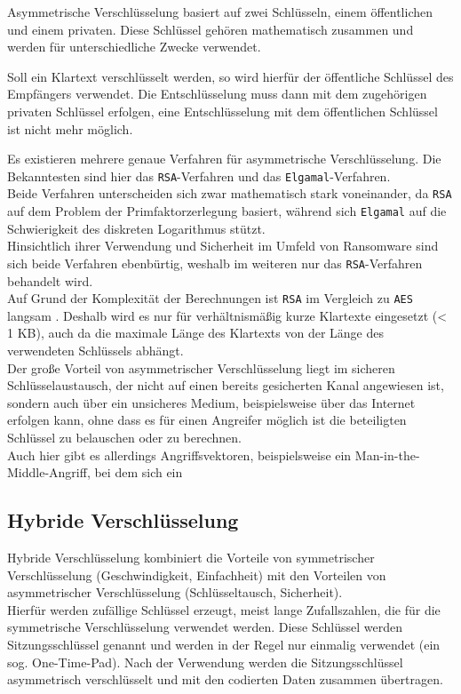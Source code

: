 Asymmetrische Verschlüsselung basiert auf zwei Schlüsseln, einem öffentlichen und einem privaten. Diese Schlüssel gehören mathematisch zusammen und werden für unterschiedliche Zwecke verwendet.

Soll ein Klartext verschlüsselt werden, so wird hierfür der öffentliche Schlüssel des Empfängers verwendet. Die Entschlüsselung muss dann mit dem zugehörigen privaten Schlüssel erfolgen, eine Entschlüsselung mit dem öffentlichen Schlüssel ist nicht mehr möglich.

Es existieren mehrere genaue Verfahren für asymmetrische Verschlüsselung. Die Bekanntesten sind hier das \texttt{RSA}-Verfahren und das \texttt{Elgamal}-Verfahren.\\
Beide Verfahren unterscheiden sich zwar mathematisch stark voneinander, da \texttt{RSA} auf dem Problem der Primfaktorzerlegung basiert, während sich \texttt{Elgamal} auf die Schwierigkeit des diskreten Logarithmus stützt. \\
Hinsichtlich ihrer Verwendung und Sicherheit im Umfeld von Ransomware sind sich beide Verfahren ebenbürtig, weshalb im weiteren nur das \texttt{RSA}-Verfahren behandelt wird.
\\

Auf Grund der Komplexität der Berechnungen ist \texttt{RSA} im Vergleich zu \texttt{AES} langsam \cite{crypto:aes_rsa_benchmark}. Deshalb wird es nur für verhältnismäßig kurze Klartexte eingesetzt (< 1 KB), auch da die maximale Länge des Klartexts von der Länge des verwendeten Schlüssels abhängt. %
\\

Der große Vorteil von asymmetrischer Verschlüsselung liegt im sicheren Schlüsselaustausch, der nicht auf einen bereits gesicherten Kanal angewiesen ist, sondern auch über ein unsicheres Medium, beispielsweise über das Internet erfolgen kann, ohne dass es für einen Angreifer möglich ist die beteiligten Schlüssel zu belauschen oder zu berechnen. \\
Auch hier gibt es allerdings Angriffsvektoren, beispielsweise ein Man-in-the-Middle-Angriff, bei dem sich ein 

\subsection{Hybride Verschlüsselung}
\label{sec:hybride_verschl}

Hybride Verschlüsselung kombiniert die Vorteile von symmetrischer Verschlüsselung (Geschwindigkeit, Einfachheit) mit den Vorteilen von asymmetrischer Verschlüsselung (Schlüsseltausch, Sicherheit). \\
Hierfür werden zufällige Schlüssel erzeugt, meist lange Zufallszahlen, die für die symmetrische Verschlüsselung verwendet werden. Diese Schlüssel werden Sitzungsschlüssel genannt und werden in der Regel nur einmalig verwendet (ein sog. One-Time-Pad). Nach der Verwendung werden die Sitzungsschlüssel asymmetrisch verschlüsselt und mit den codierten Daten zusammen übertragen.

